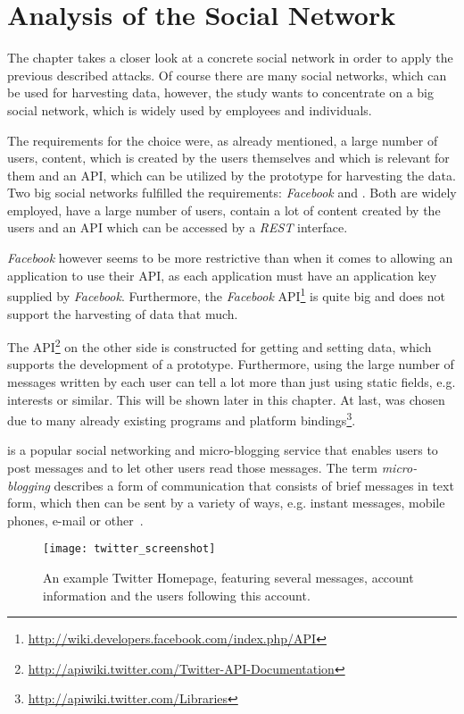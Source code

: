 \chapter{Analysis of the Social Network \Twitter}
\label{chap:analysis}

The chapter takes a closer look at a concrete social network in order to
apply the previous described attacks. Of course there are many social
networks, which can be used for harvesting data, however, the study wants to
concentrate on a big social network, which is widely used by employees and
individuals.

The requirements for the choice were, as already mentioned, a large number of
users, content, which is created by the users themselves and which is relevant
for them and an API, which can be utilized by the prototype for harvesting the
data. Two big social networks fulfilled the requirements: \textit{Facebook}
and \Twitter. Both are widely employed, have a large number of users, contain a
lot of content created by the users and an API which can be accessed by a
\textit{REST} interface.

\textit{Facebook} however seems to be more restrictive than \Twitter{} when it
comes to allowing an application to use their API, as each application must
have an application key supplied by \textit{Facebook}. Furthermore, the
\textit{Facebook}
API\footnote{\url{http://wiki.developers.facebook.com/index.php/API}} is quite
big and does not support the harvesting of data that much.

The \Twitter{}
API\footnote{\url{http://apiwiki.twitter.com/Twitter-API-Documentation}} on the
other side is constructed for getting and setting data, which supports the
development of a prototype. Furthermore, using the large number of messages
written by each \Twitter{} user can tell a lot more than just using static
fields, e.g. interests or similar. This will be shown later in this chapter.
At last, \Twitter{} was chosen due to many already existing programs and
platform bindings\footnote{\url{http://apiwiki.twitter.com/Libraries}}.

\Twitter{} is a popular social networking and micro-blogging service that
enables users to post messages and to let other users read those messages.
The term \textit{micro-blogging} describes a form of communication that
consists of brief messages in text form, which then can be sent by a variety
of ways, e.g. instant messages, mobile phones, e-mail or other~\cite{java2007}.

\begin{figure}[hbt]
  \centering
  \texttt{[image: twitter\_screenshot]}
  \caption{An example Twitter Homepage, featuring several \Twitter{}
  messages, account information and the users following this account.}
  \label{fig:twitter_screenshot}
\end{figure}

